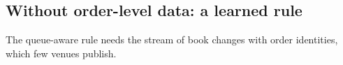 \subsection{Without order-level data: a learned rule}
\label{sec:learned}
The queue-aware rule needs the stream of book changes with order identities,
which few venues publish. \tbd
